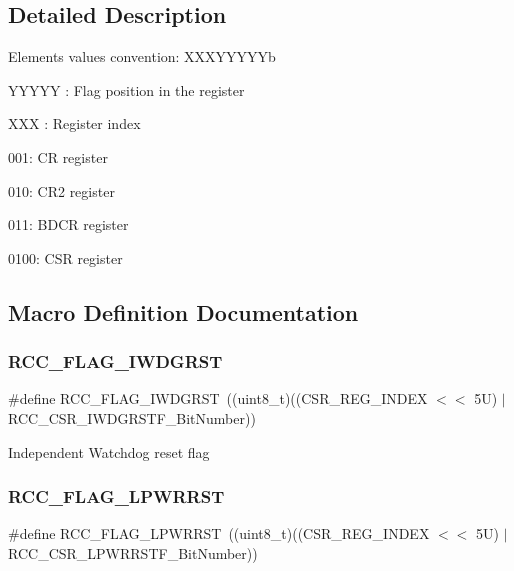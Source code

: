 \subsection{Detailed Description}
Elements values convention\+: X\+X\+X\+Y\+Y\+Y\+Y\+Yb
\begin{DoxyItemize}
\item Y\+Y\+Y\+YY \+: Flag position in the register
\item X\+XX \+: Register index
\begin{DoxyItemize}
\item 001\+: CR register
\item 010\+: C\+R2 register
\item 011\+: B\+D\+CR register
\item 0100\+: C\+SR register 
\end{DoxyItemize}
\end{DoxyItemize}

\subsection{Macro Definition Documentation}
\mbox{\label{group___r_c_c___flag_gaac46bac8a97cf16635ff7ffc1e6c657f}} 
\subsubsection{\texorpdfstring{R\+C\+C\+\_\+\+F\+L\+A\+G\+\_\+\+I\+W\+D\+G\+R\+ST}{RCC\_FLAG\_IWDGRST}}
{\footnotesize\ttfamily \#define R\+C\+C\+\_\+\+F\+L\+A\+G\+\_\+\+I\+W\+D\+G\+R\+ST~((uint8\+\_\+t)((C\+S\+R\+\_\+\+R\+E\+G\+\_\+\+I\+N\+D\+EX $<$$<$ 5\+U) $\vert$ R\+C\+C\+\_\+\+C\+S\+R\+\_\+\+I\+W\+D\+G\+R\+S\+T\+F\+\_\+\+Bit\+Number))}

Independent Watchdog reset flag \mbox{\label{group___r_c_c___flag_ga67049531354aed7546971163d02c9920}} 
\subsubsection{\texorpdfstring{R\+C\+C\+\_\+\+F\+L\+A\+G\+\_\+\+L\+P\+W\+R\+R\+ST}{RCC\_FLAG\_LPWRRST}}
{\footnotesize\ttfamily \#define R\+C\+C\+\_\+\+F\+L\+A\+G\+\_\+\+L\+P\+W\+R\+R\+ST~((uint8\+\_\+t)((C\+S\+R\+\_\+\+R\+E\+G\+\_\+\+I\+N\+D\+EX $<$$<$ 5\+U) $\vert$ R\+C\+C\+\_\+\+C\+S\+R\+\_\+\+L\+P\+W\+R\+R\+S\+T\+F\+\_\+\+Bit\+Number))}

